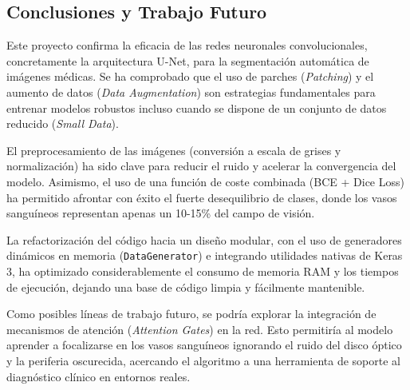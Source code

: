 \documentclass[conference]{IEEEtran}
\begin{document}
\subsection{Conclusiones y Trabajo Futuro}
Este proyecto confirma la eficacia de las redes neuronales convolucionales, concretamente la arquitectura U-Net, para la segmentación automática de imágenes médicas. Se ha comprobado que el uso de parches (\textit{Patching}) y el aumento de datos (\textit{Data Augmentation}) son estrategias fundamentales para entrenar modelos robustos incluso cuando se dispone de un conjunto de datos reducido (\textit{Small Data}).

El preprocesamiento de las imágenes (conversión a escala de grises y normalización) ha sido clave para reducir el ruido y acelerar la convergencia del modelo. Asimismo, el uso de una función de coste combinada (BCE + Dice Loss) ha permitido afrontar con éxito el fuerte desequilibrio de clases, donde los vasos sanguíneos representan apenas un 10-15\% del campo de visión.

La refactorización del código hacia un diseño modular, con el uso de generadores dinámicos en memoria (\texttt{DataGenerator}) e integrando utilidades nativas de Keras 3, ha optimizado considerablemente el consumo de memoria RAM y los tiempos de ejecución, dejando una base de código limpia y fácilmente mantenible.

Como posibles líneas de trabajo futuro, se podría explorar la integración de mecanismos de atención (\textit{Attention Gates}) en la red. Esto permitiría al modelo aprender a focalizarse en los vasos sanguíneos ignorando el ruido del disco óptico y la periferia oscurecida, acercando el algoritmo a una herramienta de soporte al diagnóstico clínico en entornos reales.
\end{document}
